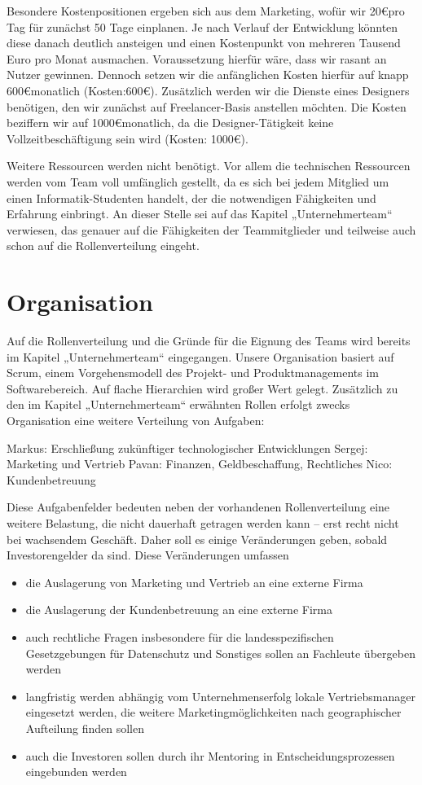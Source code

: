 Besondere Kostenpositionen ergeben sich aus dem Marketing, wofür wir 20\euro pro Tag für zunächst 50 Tage einplanen. Je nach Verlauf der Entwicklung könnten diese danach deutlich ansteigen und einen Kostenpunkt von mehreren Tausend Euro pro Monat ausmachen. Voraussetzung hierfür wäre, dass wir rasant an Nutzer gewinnen. Dennoch setzen wir die anfänglichen Kosten hierfür auf knapp 600\euro monatlich  (Kosten:600\euro).
Zusätzlich werden wir die Dienste eines Designers benötigen, den wir zunächst auf Freelancer-Basis anstellen möchten. Die Kosten beziffern wir auf 1000\euro monatlich, da die Designer-Tätigkeit keine Vollzeitbeschäftigung sein wird (Kosten: 1000\euro).

Weitere Ressourcen werden nicht benötigt. Vor allem die technischen Ressourcen werden vom Team voll umfänglich gestellt, da es sich bei jedem Mitglied um einen Informatik-Studenten handelt, der die notwendigen Fähigkeiten und Erfahrung einbringt. An dieser Stelle sei auf das Kapitel „Unternehmerteam“ verwiesen, das genauer auf die Fähigkeiten der Teammitglieder und teilweise auch schon auf die Rollenverteilung eingeht.


\section{Organisation}
Auf die Rollenverteilung und die Gründe für die Eignung des Teams wird bereits im Kapitel „Unternehmerteam“ eingegangen. Unsere Organisation basiert auf Scrum, einem Vorgehensmodell des Projekt- und Produktmanagements im Softwarebereich. Auf flache Hierarchien wird großer Wert gelegt. Zusätzlich zu den im Kapitel „Unternehmerteam“ erwähnten Rollen erfolgt zwecks Organisation eine weitere Verteilung von Aufgaben:

Markus: Erschließung zukünftiger technologischer Entwicklungen
Sergej: Marketing und Vertrieb
Pavan: Finanzen, Geldbeschaffung, Rechtliches
Nico: Kundenbetreuung

Diese Aufgabenfelder bedeuten neben der vorhandenen Rollenverteilung eine weitere Belastung, die nicht dauerhaft getragen werden kann – erst recht nicht bei wachsendem Geschäft. Daher soll es einige Veränderungen geben, sobald Investorengelder da sind. Diese Veränderungen umfassen

\begin{itemize}
\item die Auslagerung von Marketing und Vertrieb an eine externe Firma
\item die Auslagerung der Kundenbetreuung an eine externe Firma
\item auch rechtliche Fragen insbesondere für die landesspezifischen Gesetzgebungen für Datenschutz und Sonstiges sollen an Fachleute übergeben werden
\item langfristig werden abhängig vom Unternehmenserfolg lokale Vertriebsmanager eingesetzt werden, die weitere Marketingmöglichkeiten nach geographischer Aufteilung finden sollen
\item auch die Investoren sollen durch ihr Mentoring in Entscheidungsprozessen eingebunden werden
\end{itemize}


